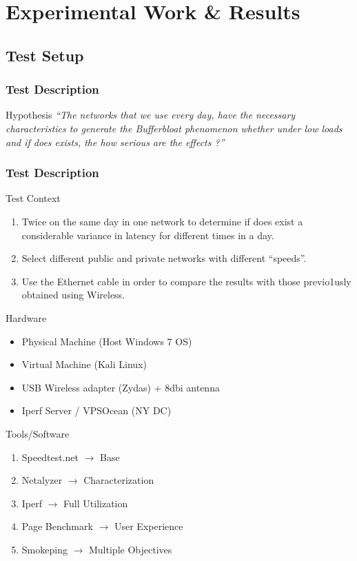 \section{Experimental Work \& Results}
\subsection{Test Setup}
\begin{frame}
	\frametitle{Test Description}
	\begin{alertblock}{Hypothesis}
		\textit{``The networks that we use every day, have the necessary characteristics to
		generate the Bufferbloat phenomenon whether under low loads and if does exists, the how
	serious are the effects ?''}
	\end{alertblock}
\end{frame}
\begin{frame}
	\frametitle{Test Description}
	\begin{block}{Test Context}
		\begin{enumerate}
			\item Twice on the same day in one network to determine if does exist a considerable variance in latency for different times in a day.
			\item Select different public and private networks with different ``speeds''.
			\item Use the Ethernet cable in order to compare the results with those previo1usly obtained using Wireless.
		\end{enumerate}
	\end{block}
\end{frame}

\begin{frame}
	\begin{block}{Hardware}
		\begin{itemize}
			\item Physical Machine (Host Windows 7 OS)
			\item Virtual Machine (Kali Linux) 
			\item USB Wireless adapter (Zydas) + 8dbi antenna 
			\item Iperf Server / VPS\@Digital Ocean (NY DC)
		\end{itemize}
	\end{block}

	\begin{block}{Tools/Software}
		\begin{enumerate}[I]
			\item Speedtest.net $\rightarrow$ Base 
			\item Netalyzer $\rightarrow$ Characterization
			\item Iperf $\rightarrow$ Full Utilization
			\item Page Benchmark $\rightarrow$ User Experience
			\item Smokeping $\rightarrow$ Multiple Objectives
		\end{enumerate}
	\end{block}
\end{frame}

